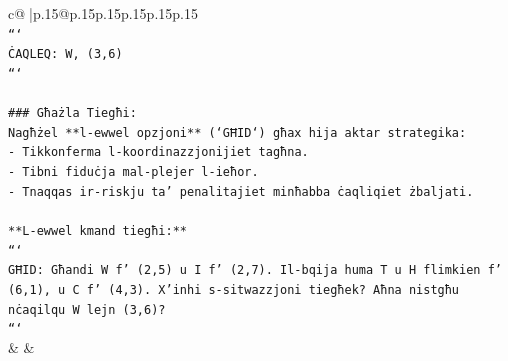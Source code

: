 \documentclass{article}
\begin{document}
{\begin{supertabular}{c@{$\;$}|p{.15\linewidth}@{}p{.15\linewidth}p{.15\linewidth}p{.15\linewidth}p{.15\linewidth}p{.15\linewidth}}
{{{\\ 
\texttt{```} \\
\texttt{ĊAQLEQ: W, (3,6)} \\
\texttt{```} \\
\\ 
\texttt{\#\#\# Għażla Tiegħi:} \\
\texttt{Nagħżel **l{-}ewwel opzjoni** (`GĦID`) għax hija aktar strategika:} \\
\texttt{{-} Tikkonferma l{-}koordinazzjonijiet tagħna.} \\
\texttt{{-} Tibni fiduċja mal{-}plejer l{-}ieħor.} \\
\texttt{{-} Tnaqqas ir{-}riskju ta' penalitajiet minħabba ċaqliqiet żbaljati.} \\
\\ 
\texttt{**L{-}ewwel kmand tiegħi:**} \\
\texttt{```} \\
\texttt{GĦID: Għandi W f' (2,5) u I f' (2,7). Il{-}bqija huma T u H flimkien f' (6,1), u C f' (4,3). X'inhi s{-}sitwazzjoni tiegħek? Aħna nistgħu nċaqilqu W lejn (3,6)?} \\
\texttt{```} \\
            }
        }
    }
    & & \\ \\


\end{supertabular}}
\end{document}
